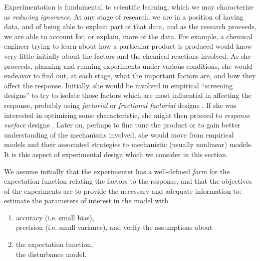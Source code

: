 Experimentation is fundamental to scientific learning, which we
may characterize as \emph{reducing ignorance}.
At any stage of research, we are in a position of having data,
and of being able to explain part of that data, and
as the research proceeds, we are able to account for, or
explain, more of the data.
For example, a chemical engineer trying to learn about how a
particular product is produced would know very little initially
about the factors and the chemical reactions involved.
As she proceeds, planning and running experiments under various
conditions, she would endeavor to find out, at each stage, what
the important factors are, and how they affect the response.
Initially, she would be involved in empirical ``screening designs''
to try to isolate those factors which are most influential in
affecting the response, probably using \emph{factorial} or
\emph{fractional factorial} designs
\cite{box:hunt:hunt:1978}.
If she was interested in optimizing some characteristic, she
might then proceed to \emph{response surface} designs
\cite{box:drap:1987,box:hunt:hunt:1978}.
Later on, perhaps to fine tune the product or to gain better
understanding of the mechanisms involved, she would move from
empirical models and their associated strategies to mechanistic
(usually nonlinear) models.
It is this aspect of experimental design which we consider in
this section.

We assume initially that the experimenter has a well-defined
\emph{form} for the expectation function relating the
factors to the response, and that the objectives
of the experiments are to provide the necessary and adequate
information to:
estimate the parameters of interest in the model with
  \begin{enumerate}
    \item accuracy (i.e. small bias),\\
          precision (i.e. small variance), and
verify the assumptions about
    \item the expectation function,\\
          the disturbance model.
  \end{enumerate}

